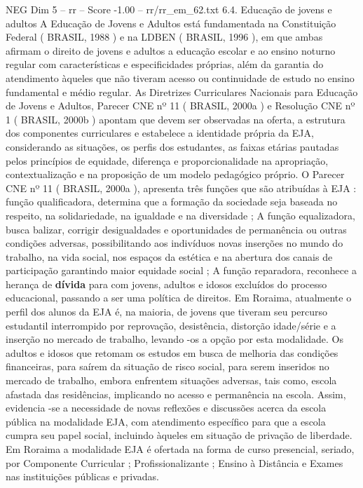 \begin{textsample}{NEG Dim 5 – rr – Score -1.00 – rr/rr\_em\_62.txt}  \label{ex:f5_neg_066}
6.4.
Educação de jovens e adultos A Educação de Jovens e Adultos está fundamentada na Constituição Federal ( BRASIL, 1988 ) e na LDBEN ( BRASIL, 1996 ), em que ambas afirmam o direito de jovens e adultos a educação escolar e ao ensino noturno regular com características e especificidades próprias, além da garantia do atendimento àqueles que não tiveram acesso ou continuidade de estudo no ensino fundamental e médio regular.
As Diretrizes Curriculares Nacionais para Educação de Jovens e Adultos, Parecer CNE nº 11 ( BRASIL, 2000a ) e Resolução CNE nº 1 ( BRASIL, 2000b ) apontam que devem ser observadas na oferta, a estrutura dos componentes curriculares e estabelece a identidade própria da EJA, considerando as situações, os perfis dos estudantes, as faixas etárias pautadas pelos princípios de equidade, diferença e proporcionalidade na apropriação, contextualização e na proposição de um modelo pedagógico próprio.
O Parecer CNE nº 11 ( BRASIL, 2000a ), apresenta três funções que são atribuídas à EJA : função qualificadora, determina que a formação da sociedade seja baseada no respeito, na solidariedade, na igualdade e na diversidade ; A função equalizadora, busca balizar, corrigir desigualdades e oportunidades de permanência ou outras condições adversas, possibilitando aos indivíduos novas inserções no mundo do trabalho, na vida social, nos espaços da estética e na abertura dos canais de participação garantindo maior equidade social ; A função reparadora, reconhece a herança de \textbf{dívida} para com jovens, adultos e idosos excluídos do processo educacional, passando a ser uma política de direitos.
Em Roraima, atualmente o perfil dos alunos da EJA é, na maioria, de jovens que tiveram seu percurso estudantil interrompido por reprovação, desistência, distorção idade/série e a inserção no mercado de trabalho, levando -os a opção por esta modalidade.
Os adultos e idosos que retomam os estudos em busca de melhoria das condições financeiras, para saírem da situação de risco social, para serem inseridos no mercado de trabalho, embora enfrentem situações adversas, tais como, escola afastada das residências, implicando no acesso e permanência na escola.
Assim, evidencia -se a necessidade de novas reflexões e discussões acerca da escola pública na modalidade EJA, com atendimento específico para que a escola cumpra seu papel social, incluindo àqueles em situação de privação de liberdade.
Em Roraima a modalidade EJA é ofertada na forma de curso presencial, seriado, por Componente Curricular ; Profissionalizante ; Ensino à Distância e Exames nas instituições públicas e privadas.

\end{textsample}

